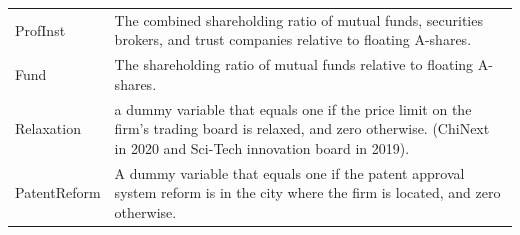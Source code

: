 \begin{table}[htbp]
\begin{tabular}{p{2.0cm} p{13cm}}
ProfInst   & The combined shareholding ratio of mutual funds, securities brokers, and trust companies relative to floating A-shares. \\
Fund   & The shareholding ratio of mutual funds relative to floating A-shares. \\
Relaxation   & a dummy variable that equals one if the price limit on the firm’s trading board is relaxed, and zero otherwise. (ChiNext in 2020 and Sci-Tech innovation board in 2019). \\
PatentReform   & A dummy variable that equals one if the patent approval system reform is in the city where the firm is located, and zero otherwise. \\

\bottomrule
\end{tabular}
\end{table}